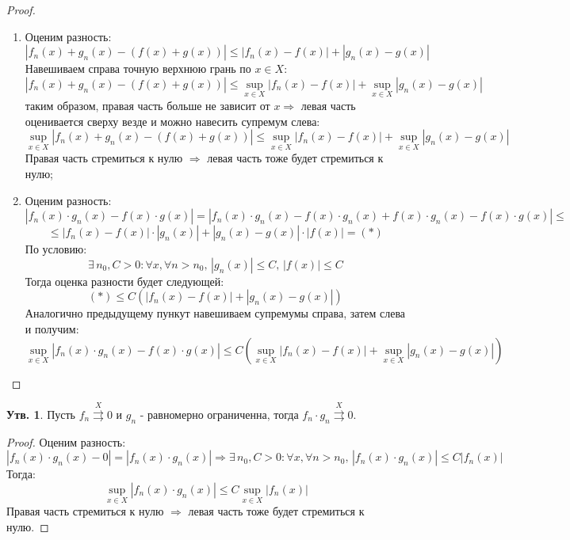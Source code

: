 \documentclass[12pt]{article}
\theoremstyle{definition}
\newtheorem{prop}{Утв.}
\newcommand{\uconv}[1]{\overset{#1}{\rightrightarrows}}
\begin{document}
\begin{proof}\hfill
	\begin{enumerate}[label ={(\arabic*)}]
		\item Оценим разность:
		$$
			|f_n(x) + g_n(x) - (f(x) + g(x))| \leq |f_n(x) - f(x)| + |g_n(x) - g(x)|
		$$
		Навешиваем справа точную верхнюю грань по $x \in X$:
		$$
			|f_n(x) + g_n(x) - (f(x) + g(x))| \leq \sup\limits_{x \in X}|f_n(x) - f(x)| + \sup\limits_{x \in X}|g_n(x) - g(x)|
		$$
		таким образом, правая часть больше не зависит от $x \Rightarrow$ левая часть оценивается сверху везде и можно навесить супремум слева:
		$$
			\sup\limits_{x \in X}|f_n(x) + g_n(x) - (f(x) + g(x))| \leq \sup\limits_{x \in X}|f_n(x) - f(x)| + \sup\limits_{x \in X}|g_n(x) - g(x)|
		$$
		Правая часть стремиться к нулю $\Rightarrow$ левая часть тоже будет стремиться к нулю;
		
		\item Оценим разность:
		$$
			|f_n(x){\cdot} g_n(x) - f(x){\cdot}g(x)| = |f_n(x){\cdot} g_n(x) - f(x){\cdot}g_n(x) + f(x){\cdot}g_n(x) - f(x){\cdot}g(x)| \leq
		$$
		$$
			\leq |f_n(x) - f(x)|{\cdot}|g_n(x)| + |g_n(x) - g(x)|{\cdot}|f(x)| = (*)
		$$
		По условию: 
		$$
			\exists \, n_0, C > 0 \colon \forall x, \forall n > n_0, \, |g_n(x)|\leq C, \, |f(x)| \leq C
		$$
		Тогда оценка разности будет следующей:
		$$
			(*)\leq C \left(|f_n(x) - f(x)| + |g_n(x) - g(x)|\right)
		$$
		Аналогично предыдущему пункут навешиваем супремумы справа, затем слева и получим:
		$$
			\sup\limits_{x \in X}|f_n(x){\cdot} g_n(x) - f(x){\cdot}g(x)| \leq C \left(\sup\limits_{x \in X}|f_n(x) - f(x)| + \sup\limits_{x \in X}|g_n(x) - g(x)|\right)
		$$
	\end{enumerate}
\end{proof}
\begin{prop}
	Пусть $f_n \uconv{X} 0$ и $g_n$ - равномерно ограниченна, тогда $f_n {\cdot} g_n \uconv{X} 0$.
\end{prop}
\begin{proof}
	Оценим разность:
	$$
		|f_n(x){\cdot}g_n(x) - 0| = |f_n(x){\cdot}g_n(x)| \Rightarrow \exists \, n_0, C > 0 \colon \forall x, \forall n > n_0, \, |f_n(x){\cdot}g_n(x)| \leq C|f_n(x)|
	$$
	Тогда:
	$$
		\sup\limits_{x \in X}|f_n(x){\cdot}g_n(x)| \leq C \sup\limits_{x \in X}|f_n(x)|
	$$
	Правая часть стремиться к нулю $\Rightarrow$ левая часть тоже будет стремиться к нулю.
\end{proof}
\end{document}
